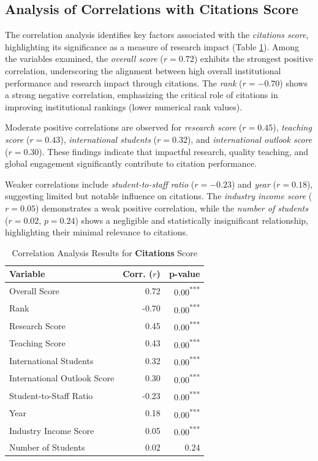 \documentclass[conference]{IEEEtran}
\begin{document}
\subsection{Analysis of Correlations with Citations Score}

The correlation analysis identifies key factors associated with the \textit{citations score}, highlighting its significance as a measure of research impact (Table \ref{tab:correlation_citations}). Among the variables examined, the \textit{overall score} ($r = 0.72$) exhibits the strongest positive correlation, underscoring the alignment between high overall institutional performance and research impact through citations. The \textit{rank} ($r = -0.70$) shows a strong negative correlation, emphasizing the critical role of citations in improving institutional rankings (lower numerical rank values).

Moderate positive correlations are observed for \textit{research score} ($r = 0.45$), \textit{teaching score} ($r = 0.43$), \textit{international students} ($r = 0.32$), and \textit{international outlook score} ($r = 0.30$). These findings indicate that impactful research, quality teaching, and global engagement significantly contribute to citation performance.

Weaker correlations include \textit{student-to-staff ratio} ($r = -0.23$) and \textit{year} ($r = 0.18$), suggesting limited but notable influence on citations. The \textit{industry income score} ($r = 0.05$) demonstrates a weak positive correlation, while the \textit{number of students} ($r = 0.02$, $p = 0.24$) shows a negligible and statistically insignificant relationship, highlighting their minimal relevance to citations.

\begin{table}[h!]
	\centering
	\caption{Correlation Analysis Results for \textbf{Citations} Score}
	\label{tab:correlation_citations}
	\begin{tabular}{|l|r|r|}
		\hline
		\textbf{Variable} & \textbf{Corr. ($r$)} & \textbf{p-value} \\
		\hline
		Overall Score & 0.72 & 0.00\textsuperscript{***} \\
		Rank & -0.70 & 0.00\textsuperscript{***} \\
		Research Score & 0.45 & 0.00\textsuperscript{***} \\
		Teaching Score & 0.43 & 0.00\textsuperscript{***} \\
		International Students & 0.32 & 0.00\textsuperscript{***} \\
		International Outlook Score & 0.30 & 0.00\textsuperscript{***} \\
		Student-to-Staff Ratio & -0.23 & 0.00\textsuperscript{***} \\
		Year & 0.18 & 0.00\textsuperscript{***} \\
		Industry Income Score & 0.05 & 0.00\textsuperscript{***} \\
		Number of Students & 0.02 & 0.24 \\
		\hline
	\end{tabular}
\end{table}
\end{document}
